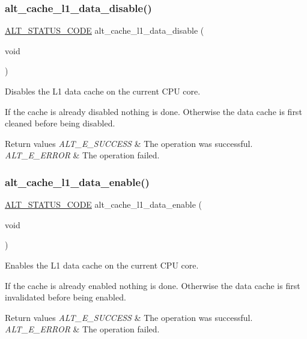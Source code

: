\subsubsection{\texorpdfstring{alt\_cache\_l1\_data\_disable()}{alt\_cache\_l1\_data\_disable()}}
{\footnotesize\ttfamily \mbox{\hyperlink{hwlib_8h_abdb0d369f069723ca55d6c94bcaaaa12}{A\+L\+T\+\_\+\+S\+T\+A\+T\+U\+S\+\_\+\+C\+O\+DE}} alt\+\_\+cache\+\_\+l1\+\_\+data\+\_\+disable (\begin{DoxyParamCaption}\item[{void}]{ }\end{DoxyParamCaption})}

Disables the L1 data cache on the current C\+PU core.

If the cache is already disabled nothing is done. Otherwise the data cache is first cleaned before being disabled.


\begin{DoxyRetVals}{Return values}
{\em A\+L\+T\+\_\+\+E\+\_\+\+S\+U\+C\+C\+E\+SS} & The operation was successful. \\
\hline
{\em A\+L\+T\+\_\+\+E\+\_\+\+E\+R\+R\+OR} & The operation failed. \\
\hline
\end{DoxyRetVals}
\mbox{\label{group__CACHE__L1_ga7cf879a94e789a076a0ba1f8b53ba24c}} 
\subsubsection{\texorpdfstring{alt\_cache\_l1\_data\_enable()}{alt\_cache\_l1\_data\_enable()}}
{\footnotesize\ttfamily \mbox{\hyperlink{hwlib_8h_abdb0d369f069723ca55d6c94bcaaaa12}{A\+L\+T\+\_\+\+S\+T\+A\+T\+U\+S\+\_\+\+C\+O\+DE}} alt\+\_\+cache\+\_\+l1\+\_\+data\+\_\+enable (\begin{DoxyParamCaption}\item[{void}]{ }\end{DoxyParamCaption})}

Enables the L1 data cache on the current C\+PU core.

If the cache is already enabled nothing is done. Otherwise the data cache is first invalidated before being enabled.


\begin{DoxyRetVals}{Return values}
{\em A\+L\+T\+\_\+\+E\+\_\+\+S\+U\+C\+C\+E\+SS} & The operation was successful. \\
\hline
{\em A\+L\+T\+\_\+\+E\+\_\+\+E\+R\+R\+OR} & The operation failed. \\
\hline
\end{DoxyRetVals}
\mbox{\label{group__CACHE__L1_ga5cb15e1f4ec7c3a3d90e377093e6e343}} 
